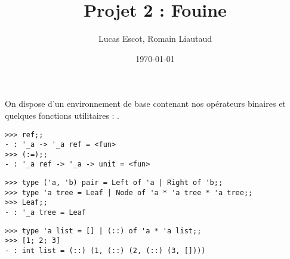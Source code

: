 \documentclass[paper=a4, fontsize=11pt]{scrartcl}
\title{Projet 2 : Fouine}
\author{Lucas Escot, Romain Liautaud}
\date{\today}
\begin{document}
\maketitle

On dispose d'un environnement de base contenant nos opérateurs binaires et quelques fonctions utilitaires : .
\begin{verbatim}
>>> ref;;
- : '_a -> '_a ref = <fun>
>>> (:=);;
- : '_a ref -> '_a -> unit = <fun>
\end{verbatim}

\begin{verbatim}
>>> type ('a, 'b) pair = Left of 'a | Right of 'b;;
>>> type 'a tree = Leaf | Node of 'a * 'a tree * 'a tree;;
>>> Leaf;;
- : '_a tree = Leaf
\end{verbatim}
\begin{verbatim}
>>> type 'a list = [] | (::) of 'a * 'a list;;
>>> [1; 2; 3]
- : int list = (::) (1, (::) (2, (::) (3, [])))
\end{verbatim}
\end{document}
